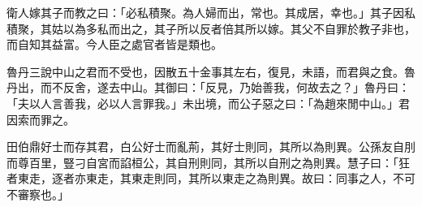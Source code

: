 \begin{pinyinscope}
衛人嫁其子而教之曰：「必私積聚。為人婦而出，常也。其成居，幸也。」其子因私積聚，其姑以為多私而出之，其子所以反者倍其所以嫁。其父不自罪於教子非也，而自知其益富。今人臣之處官者皆是類也。

魯丹三說中山之君而不受也，因散五十金事其左右，復見，未語，而君與之食。魯丹出，而不反舍，遂去中山。其御曰：「反見，乃始善我，何故去之？」魯丹曰：「夫以人言善我，必以人言罪我。」未出境，而公子惡之曰：「為趙來閒中山。」君因索而罪之。

田伯鼎好士而存其君，白公好士而亂荊，其好士則同，其所以為則異。公孫友自刖而尊百里，豎刁自宮而諂桓公，其自刑則同，其所以自刑之為則異。慧子曰：「狂者東走，逐者亦東走，其東走則同，其所以東走之為則異。故曰：同事之人，不可不審察也。」


\end{pinyinscope}